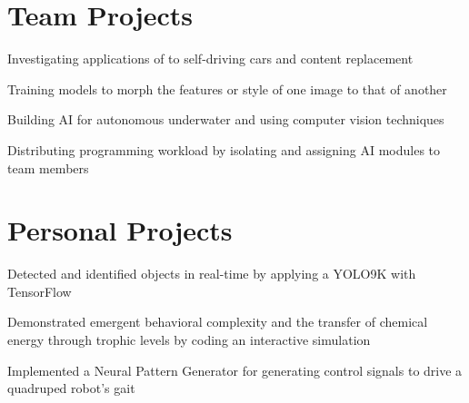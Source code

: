 \documentclass[]{deedy-resume-openfont}
\begin{document}
\begin{minipage}[t]{0.66\textwidth}

\section{Team Projects}

\begin{tightemize}
\item Investigating applications of  to self-driving cars and content replacement
\item Training models to morph the features or style of one image to that of another
\end{tightemize}
\sectionsep

\begin{tightemize}
\item Building AI for autonomous underwater  and  using computer vision techniques
\item Distributing programming workload by isolating and assigning AI modules to team members
\end{tightemize}
\sectionsep


\section{Personal Projects}

\descript{}
\begin{tightemize}
\item Detected and identified objects in real-time by applying a YOLO9K  with TensorFlow
\end{tightemize}
\sectionsep

\descript{}
\begin{tightemize}
\item Demonstrated emergent behavioral complexity and the transfer of chemical energy through trophic levels by coding an interactive simulation
\item Implemented a Neural Pattern Generator for generating control signals to drive a quadruped robot's gait
\end{tightemize}
\sectionsep

\end{minipage} 
\end{document}
